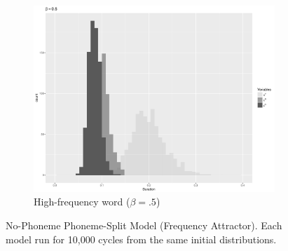 \begin{figure}[h]
\begin{subfigure}[t]{.3\textwidth}
        \includegraphics[width=\linewidth]{figures/SpeakingRateFrequencybeta5.pdf}
        \caption{High-frequency word ($\beta=.5$)}
    \end{subfigure}



\caption{\label{fig:NasalizationModel1}No-Phoneme Phoneme-Split Model (Frequency
Attractor). Each model run for 10,000 cycles from the same initial
distributions. }
\end{figure}

